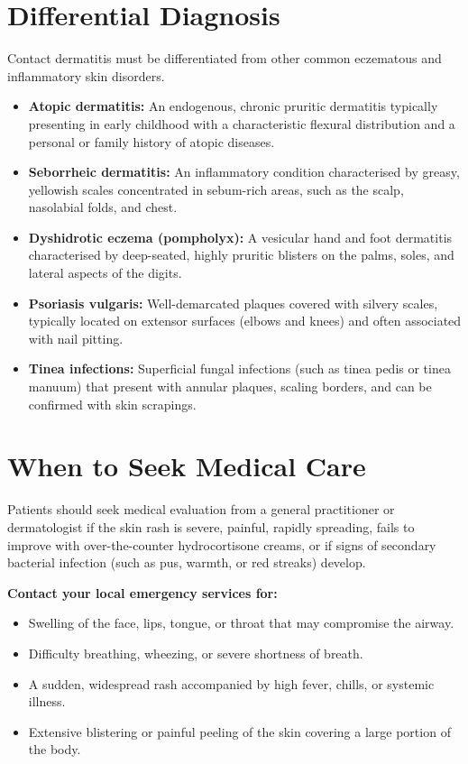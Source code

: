 \section*{Differential Diagnosis}
Contact dermatitis must be differentiated from other common eczematous and inflammatory skin disorders.

\begin{itemize}
    \item \textbf{Atopic dermatitis:} An endogenous, chronic pruritic dermatitis typically presenting in early childhood with a characteristic flexural distribution and a personal or family history of atopic diseases.
    \item \textbf{Seborrheic dermatitis:} An inflammatory condition characterised by greasy, yellowish scales concentrated in sebum-rich areas, such as the scalp, nasolabial folds, and chest.
    \item \textbf{Dyshidrotic eczema (pompholyx):} A vesicular hand and foot dermatitis characterised by deep-seated, highly pruritic blisters on the palms, soles, and lateral aspects of the digits.
    \item \textbf{Psoriasis vulgaris:} Well-demarcated plaques covered with silvery scales, typically located on extensor surfaces (elbows and knees) and often associated with nail pitting.
    \item \textbf{Tinea infections:} Superficial fungal infections (such as tinea pedis or tinea manuum) that present with annular plaques, scaling borders, and can be confirmed with skin scrapings.
\end{itemize}

\section*{When to Seek Medical Care}
Patients should seek medical evaluation from a general practitioner or dermatologist if the skin rash is severe, painful, rapidly spreading, fails to improve with over-the-counter hydrocortisone creams, or if signs of secondary bacterial infection (such as pus, warmth, or red streaks) develop.

\textbf{Contact your local emergency services for:}
\begin{itemize}
    \item Swelling of the face, lips, tongue, or throat that may compromise the airway.
    \item Difficulty breathing, wheezing, or severe shortness of breath.
    \item A sudden, widespread rash accompanied by high fever, chills, or systemic illness.
    \item Extensive blistering or painful peeling of the skin covering a large portion of the body.
\end{itemize}

